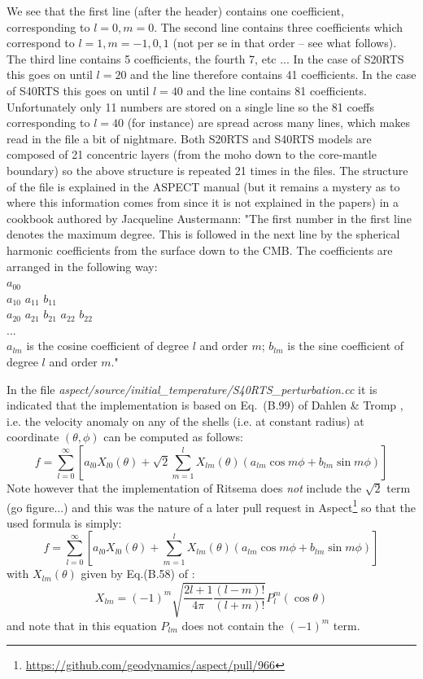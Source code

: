 We see that the first line (after the header) contains one coefficient, corresponding to ${l=0},{m=0}$. 
The second line contains three coefficients which correspond to ${l=1},{m=-1,0,1}$ (not 
per se in that order -- see what follows). The third line contains 5 
coefficients, the fourth 7, etc ... 
In the case of S20RTS this goes on until $l=20$ and the line therefore contains 41 coefficients.
In the case of S40RTS this goes on until $l=40$ and the line contains 81 coefficients.
Unfortunately only 11 numbers are stored on a single line so the 81 coeffs corresponding to $l=40$ (for instance)
are spread across many lines, which makes read in the file a bit of nightmare. 
Both S20RTS and S40RTS models are composed of 21 concentric layers (from the moho down to the core-mantle boundary) 
so the above structure is repeated 21 times in the files. 
The structure of the file is explained in the ASPECT manual (but it remains a mystery 
as to where this information comes from since it is not explained in the papers) 
in a cookbook authored by Jacqueline Austermann:  
{\color{brown}
"The first number in the first line denotes the maximum degree. This is followed in
the next line by the spherical harmonic coefficients from the surface down to the
CMB. The coefficients are arranged in the following way:\\
$a_{00}$ \\
$a_{10}$ $a_{11}$ $b_{11}$ \\
$a_{20}$ $a_{21}$ $b_{21}$ $a_{22}$ $b_{22}$ \\
... \\
$a_{lm}$ is the cosine coefficient of degree $l$ and order $m$; $b_{lm}$ is
the sine coefficient of degree $l$ and order $m$."}

In the file {\sl aspect/source/initial\_temperature/S40RTS\_perturbation.cc} it is 
indicated that the implementation is based on Eq.~(B.99) of Dahlen \& Tromp \cite{datr98}, 
i.e. the velocity anomaly on any of the shells 
(i.e. at constant radius) at coordinate $(\theta,\phi)$ can be computed as follows:
\[
f = \sum_{l=0}^\infty \left[a_{l0} X_{l0}(\theta) + \sqrt{2} \sum_{m=1}^l X_{lm}(\theta) 
\left(a_{lm} \cos m\phi + b_{lm} \sin m\phi \right) \right]
\]
Note however that the implementation of Ritsema does {\it not} include the $\sqrt{2}$ term (go figure...) and this 
was the nature of a later pull request in Aspect\footnote{\url{https://github.com/geodynamics/aspect/pull/966}} 
so that the used formula is simply:
\[
\boxed{
f = \sum_{l=0}^\infty \left[a_{l0} X_{l0}(\theta) + \sum_{m=1}^l X_{lm}(\theta) 
(a_{lm} \cos m\phi + b_{lm} \sin m\phi) \right]
}
\]
with $X_{lm}(\theta)$ given by Eq.(B.58) of  \cite{datr98}:
\[
\boxed{
X_{lm} = (-1)^m \sqrt{ \frac{2l+1}{4\pi} \frac{(l-m)!}{(l+m)!} } P_l^m(\cos\theta)
}
\]
and note that in this equation $P_{lm}$ does not contain the $(-1)^m$ term.


